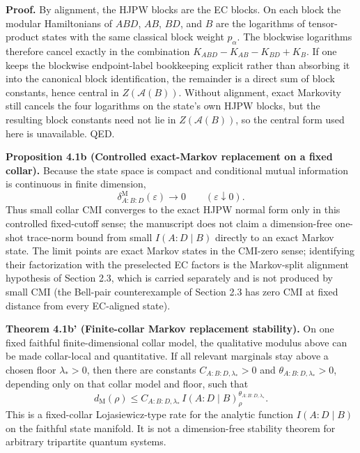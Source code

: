 \textbf{Proof.} By alignment, the HJPW blocks are the EC blocks. On each block the modular Hamiltonians of \(ABD\), \(AB\), \(BD\), and \(B\) are the logarithms of tensor-product states with the same classical block weight \(p_\alpha\). The blockwise logarithms therefore cancel exactly in the combination \(K_{ABD}-K_{AB}-K_{BD}+K_B\). If one keeps the blockwise endpoint-label bookkeeping explicit rather than absorbing it into the canonical block identification, the remainder is a direct sum of block constants, hence central in \(Z(\mathcal A(B))\). Without alignment, exact Markovity still cancels the four logarithms on the state's own HJPW blocks, but the resulting block constants need not lie in \(Z(\mathcal A(B))\), so the central form used here is unavailable. QED.

\textbf{Proposition 4.1b (Controlled exact-Markov replacement on a fixed collar).}
Because the state space is compact and conditional mutual information is continuous in finite dimension,
\[
\delta^{\mathrm M}_{A:B:D}(\varepsilon)\longrightarrow 0
\qquad
(\varepsilon\downarrow0).
\]
Thus small collar CMI converges to the exact HJPW normal form only in this controlled fixed-cutoff sense; the manuscript does not claim a dimension-free one-shot trace-norm bound from small \(I(A:D\mid B)\) directly to an exact Markov state. The limit points are exact Markov states in the CMI-zero sense; identifying their factorization with the preselected EC factors is the Markov-split alignment hypothesis of Section 2.3, which is carried separately and is not produced by small CMI (the Bell-pair counterexample of Section 2.3 has zero CMI at fixed distance from every EC-aligned state).

\textbf{Theorem 4.1b' (Finite-collar Markov replacement stability).} On one fixed faithful
finite-dimensional collar model, the qualitative modulus above can be made collar-local and
quantitative. If all relevant marginals stay above a chosen floor \(\lambda_\ast>0\), then there are
constants \(C_{A:B:D,\lambda_\ast}>0\) and \(\theta_{A:B:D,\lambda_\ast}>0\), depending only on that
collar model and floor, such that
\[
d_{\mathrm M}(\rho)
\le
C_{A:B:D,\lambda_\ast}\,
I(A:D\mid B)_\rho^{\theta_{A:B:D,\lambda_\ast}}.
\]
This is a fixed-collar Lojasiewicz-type rate for the analytic function
\(I(A:D\mid B)\) on the faithful state manifold. It is not a dimension-free stability theorem for
arbitrary tripartite quantum systems.

